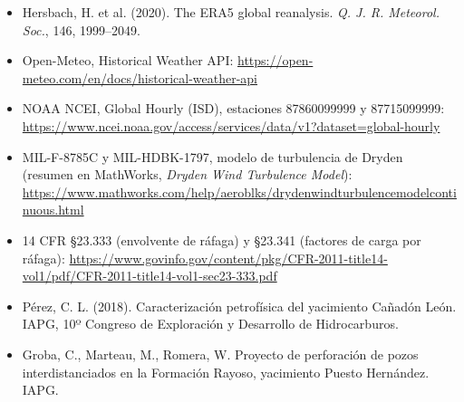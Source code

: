 \documentclass[11pt]{article}
\begin{document}
{\small\sloppy
\begin{itemize}[leftmargin=*]
  \item Hersbach, H. et al. (2020). The ERA5 global reanalysis.
  \textit{Q. J. R. Meteorol. Soc.}, 146, 1999--2049.
  \item Open-Meteo, Historical Weather API:
  \url{https://open-meteo.com/en/docs/historical-weather-api}
  \item NOAA NCEI, Global Hourly (ISD), estaciones 87860099999 y 87715099999:
  \url{https://www.ncei.noaa.gov/access/services/data/v1?dataset=global-hourly}
  \item MIL-F-8785C y MIL-HDBK-1797, modelo de turbulencia de Dryden
  (resumen en MathWorks, \textit{Dryden Wind Turbulence Model}):
  \url{https://www.mathworks.com/help/aeroblks/drydenwindturbulencemodelcontinuous.html}
  \item 14 CFR \S23.333 (envolvente de ráfaga) y \S23.341 (factores de carga
  por ráfaga):
  \url{https://www.govinfo.gov/content/pkg/CFR-2011-title14-vol1/pdf/CFR-2011-title14-vol1-sec23-333.pdf}
  \item Pérez, C. L. (2018). Caracterización petrofísica del yacimiento
  Cañadón León. IAPG, 10º Congreso de Exploración y Desarrollo de
  Hidrocarburos.
  \item Groba, C., Marteau, M., Romera, W. Proyecto de perforación de pozos
  interdistanciados en la Formación Rayoso, yacimiento Puesto Hernández. IAPG.
\end{itemize}
}
\end{document}
